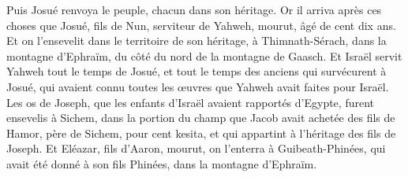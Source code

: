 \begin{multicols}{2}
Puis Josué renvoya le peuple, chacun dans son héritage.
Or il arriva après ces choses que Josué, fils de Nun, serviteur de Yahweh, mourut, âgé de cent dix ans.
Et on l'ensevelit dans le territoire de son héritage, à Thimnath-Sérach, dans la montagne d'Ephraïm, du côté du nord de la montagne de Gaasch.
Et Israël servit Yahweh tout le temps de Josué, et tout le temps des anciens qui survécurent à Josué, qui avaient connu toutes les œuvres que Yahweh avait faites pour Israël.
Les os de Joseph, que les enfants d'Israël avaient rapportés d'Egypte, furent ensevelis à Sichem, dans la portion du champ que Jacob avait achetée des fils de Hamor, père de Sichem, pour cent kesita, et qui appartint à l'héritage des fils de Joseph.
Et Eléazar, fils d'Aaron, mourut, on l'enterra à Guibeath-Phinées, qui avait été donné à son fils Phinées, dans la montagne d'Ephraïm.
\PPE{}
\end{multicols}
